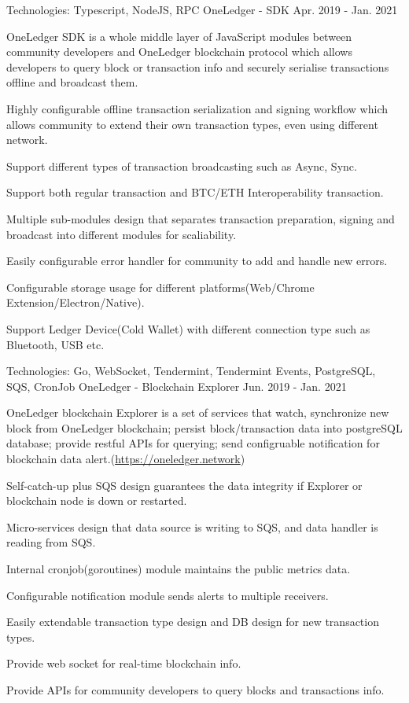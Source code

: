 \begin{cventries}
\cventry
    {Technologies: \quad Typescript, NodeJS, RPC}
    {OneLedger - SDK}
    {}
    {Apr. 2019 - Jan. 2021}
    {
      \begin{cvitems}
        \item {OneLedger SDK is a whole middle layer of JavaScript modules between community developers and OneLedger blockchain protocol which allows developers to query block or transaction info and securely serialise transactions offline and broadcast them.}
        \item {Highly configurable offline transaction serialization and signing workflow which allows community to extend their own transaction types, even using different network.}
        \item {Support different types of transaction broadcasting such as Async, Sync.}
        \item {Support both regular transaction and BTC/ETH Interoperability transaction.}
        \item {Multiple sub-modules design that separates transaction preparation, signing and broadcast into different modules for scaliability.}
        \item {Easily configurable error handler for community to add and handle new errors.}
        \item {Configurable storage usage for different platforms(Web/Chrome Extension/Electron/Native).}
        \item {Support Ledger Device(Cold Wallet) with different connection type such as Bluetooth, USB etc.}
      \end{cvitems}
    }
    
    \cventry
    {Technologies: \quad Go, WebSocket, Tendermint, Tendermint Events, PostgreSQL, SQS, CronJob}
    {OneLedger - Blockchain Explorer}
    {}
    {Jun. 2019 - Jan. 2021}
    {
      \begin{cvitems}
        \item {OneLedger blockchain Explorer is a set of services that watch, synchronize new block from OneLedger blockchain; persist block/transaction data into postgreSQL database; provide restful APIs for querying; send configruable notification for blockchain data alert.(\url{https://oneledger.network})}
        \item {Self-catch-up plus SQS design guarantees the data integrity if Explorer or blockchain node is down or restarted.}
        \item {Micro-services design that data source is writing to SQS, and data handler is reading from SQS.}
        \item {Internal cronjob(goroutines) module maintains the public metrics data.}
        \item {Configurable notification module sends alerts to multiple receivers.}
        \item {Easily extendable transaction type design and DB design for new transaction types.}
        \item {Provide web socket for real-time blockchain info.}
        \item {Provide APIs for community developers to query blocks and transactions info.}
      \end{cvitems}
    }


\end{cventries}
